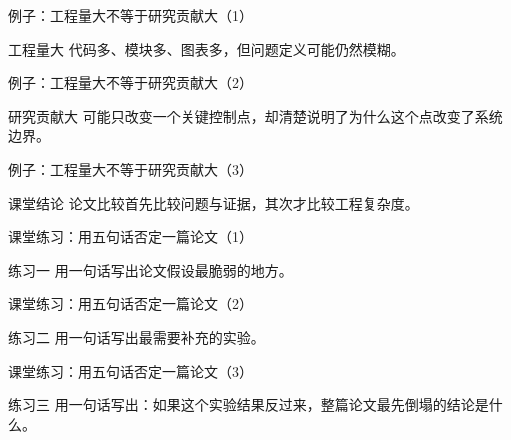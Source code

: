 \begin{frame}{例子：工程量大不等于研究贡献大（1）}
\begin{block}{工程量大}
    代码多、模块多、图表多，但问题定义可能仍然模糊。
  \end{block}
\end{frame}

\begin{frame}{例子：工程量大不等于研究贡献大（2）}
\begin{block}{研究贡献大}
    可能只改变一个关键控制点，却清楚说明了为什么这个点改变了系统边界。
  \end{block}
\end{frame}

\begin{frame}{例子：工程量大不等于研究贡献大（3）}
\begin{block}{课堂结论}
    论文比较首先比较问题与证据，其次才比较工程复杂度。
  \end{block}
\end{frame}

\begin{frame}{课堂练习：用五句话否定一篇论文（1）}
\begin{block}{练习一}
    用一句话写出论文假设最脆弱的地方。
  \end{block}
\end{frame}

\begin{frame}{课堂练习：用五句话否定一篇论文（2）}
\begin{block}{练习二}
    用一句话写出最需要补充的实验。
  \end{block}
\end{frame}

\begin{frame}{课堂练习：用五句话否定一篇论文（3）}
\begin{block}{练习三}
    用一句话写出：如果这个实验结果反过来，整篇论文最先倒塌的结论是什么。
  \end{block}
\end{frame}
